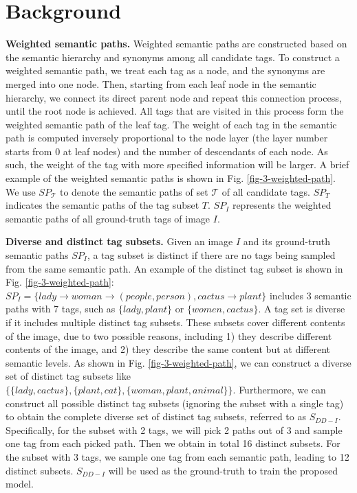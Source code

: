 \documentclass[10pt,twocolumn,letterpaper]{article}
\begin{document}
\section{Background}
\label{sec: background}


\noindent
{\bf Weighted semantic paths.} Weighted semantic paths \cite{my-cvpr-2017-dia} are constructed based on the semantic hierarchy and synonyms \cite{my-iccv-2015} among all candidate tags. To construct a weighted semantic path, we treat each tag as a node, and the synonyms are merged into one node. Then, starting from each leaf node in the semantic hierarchy, we connect its direct parent node and repeat this connection process, until the root node is achieved. All tags that are visited in this process form the weighted semantic path of the leaf tag. The weight of each tag in the semantic path is computed inversely proportional to the node layer (the layer number starts from 0 at leaf nodes) and the number of descendants of each node. 
As such, the weight of the tag with more specified information will be larger.
A brief example of the weighted semantic paths is shown in Fig. \ref{fig-3-weighted-path}. 
We use $SP_{\mathcal{T}}$ to denote the semantic paths of set $\mathcal{T}$ of all candidate tags.  
$SP_T$ indicates the semantic paths of the tag subset $T$. 
$SP_I$ represents the weighted semantic paths of all ground-truth tags of image $I$. 

\vspace{3pt}
\noindent
{\bf Diverse and distinct tag subsets.} Given an image $I$ and its ground-truth semantic paths $SP_I$, a tag subset is distinct if there are no tags being sampled from the same semantic path. 
An example of the distinct tag subset is shown in Fig. \ref{fig-3-weighted-path}:  $SP_I = \{ lady \rightarrow woman \rightarrow (people, person), cactus \rightarrow plant \}$ includes 3 semantic paths with 7 tags, such as $\{lady, plant\}$ or $\{women, cactus\}$. 
A tag set is diverse if it includes multiple distinct tag subsets. These subsets cover different contents of the image, due to two possible reasons, including 1) they describe  different contents of the image, and 2) they describe the same content but at different semantic levels.  
As shown in Fig. \ref{fig-3-weighted-path}, we can construct a diverse set of distinct tag subsets like $\{ \{lady, cactus \}, \{ plant, cat \}, \{woman, plant, animal\}  \}$. 
Furthermore, we can construct all possible distinct tag subsets (ignoring the subset with a single  tag) to obtain the complete diverse set of distinct tag subsets, referred to as $S_{DD-I}$. 
Specifically, for the subset with 2 tags, we will pick 2 paths out of 3 and sample one tag from each picked path. Then we obtain in total 16 distinct subsets. For the subset with 3 tags, we sample one tag from each semantic path, leading to 12 distinct subsets. 
$S_{DD-I}$ will be used as the ground-truth to train the proposed model.  
\end{document}
